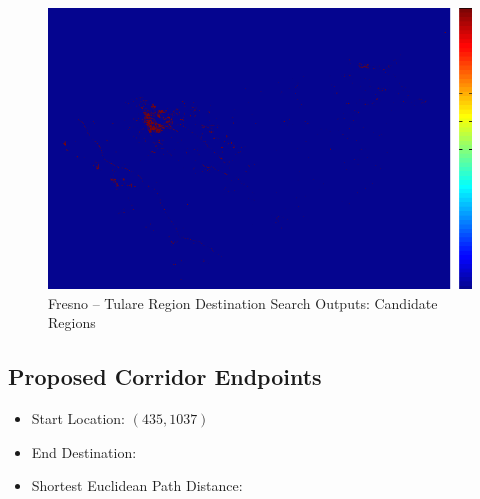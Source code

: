         \begin{figure}[!h]
            \begin{center}
            \includegraphics[width=5.5in]{figures/Fresno_Search_Output.png}   
            \caption{Fresno -- Tulare Region Destination Search Outputs: Candidate Regions}
            \label{fig:Fdsoutputs_cand}
            \end{center}
        \end{figure}

    \subsection{Proposed Corridor Endpoints}
    
    \begin{itemize}
      \setlength{\itemsep}{0cm}
      \setlength{\parskip}{0cm}
        \item Start Location: $(435,1037)$
        \item End Destination: 
        \item Shortest Euclidean Path Distance: 
    \end{itemize}
    
